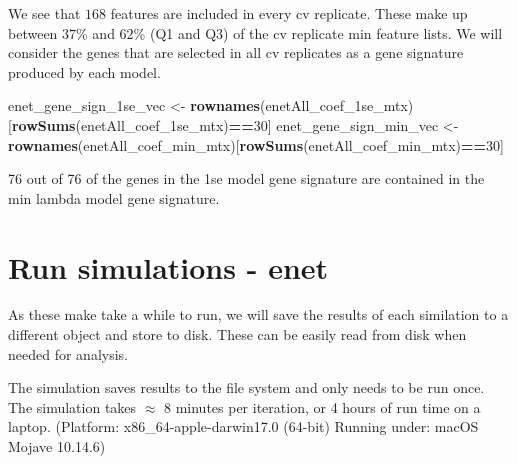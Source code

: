 \documentclass[
]{book}
\newenvironment{Shaded}{\begin{snugshade}}{\end{snugshade}}
\newcommand{\DecValTok}[1]{\textcolor[rgb]{0.00,0.00,0.81}{#1}}
\newcommand{\KeywordTok}[1]{\textcolor[rgb]{0.13,0.29,0.53}{\textbf{#1}}}
\newcommand{\NormalTok}[1]{#1}
\newcommand{\OperatorTok}[1]{\textcolor[rgb]{0.81,0.36,0.00}{\textbf{#1}}}
\newcommand{\StringTok}[1]{\textcolor[rgb]{0.31,0.60,0.02}{#1}}
\begin{document}
We see that \(168\) features are included in every
cv replicate. These make up between
\(37\)\%
and
\(62\)\%
(Q1 and Q3) of the cv replicate min feature lists.
We will consider the genes that are selected in all cv replicates as a
gene signature produced by each model.

\begin{Shaded}
\begin{Highlighting}[]
\NormalTok{enet\_gene\_sign\_1se\_vec <{-}}\StringTok{ }\KeywordTok{rownames}\NormalTok{(enetAll\_coef\_1se\_mtx)[}\KeywordTok{rowSums}\NormalTok{(enetAll\_coef\_1se\_mtx)}\OperatorTok{==}\DecValTok{30}\NormalTok{]}
\NormalTok{enet\_gene\_sign\_min\_vec <{-}}\StringTok{ }\KeywordTok{rownames}\NormalTok{(enetAll\_coef\_min\_mtx)[}\KeywordTok{rowSums}\NormalTok{(enetAll\_coef\_min\_mtx)}\OperatorTok{==}\DecValTok{30}\NormalTok{]}
\end{Highlighting}
\end{Shaded}

76 out of
76 of the genes in the 1se model gene signature
are contained in the min lambda model gene signature.

\hypertarget{run-simulations---enet}{%
\section*{Run simulations - enet}\label{run-simulations---enet}}

As these make take a while to run,
we will save the results of each similation to a different
object and store to disk. These can be easily read from disk
when needed for analysis.

The simulation saves results to the file system and
only needs to be run once. The simulation takes \(\approx\) 8 minutes
per iteration, or 4 hours of run time on a laptop.
(Platform: x86\_64-apple-darwin17.0 (64-bit)
Running under: macOS Mojave 10.14.6)
\end{document}
